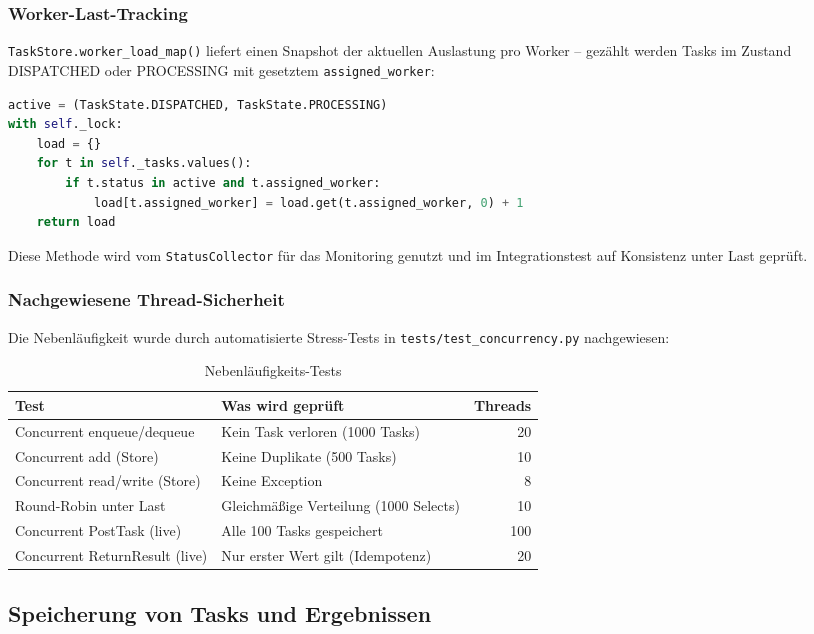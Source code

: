\subsubsection*{Worker-Last-Tracking}

\texttt{TaskStore.worker\_load\_map()} liefert einen Snapshot der aktuellen
Auslastung pro Worker -- gezählt werden Tasks im Zustand DISPATCHED oder PROCESSING
mit gesetztem \texttt{assigned\_worker}:

\begin{lstlisting}[language=Python,caption={worker\_load\_map() -- aktive Tasks pro Worker}]
active = (TaskState.DISPATCHED, TaskState.PROCESSING)
with self._lock:
    load = {}
    for t in self._tasks.values():
        if t.status in active and t.assigned_worker:
            load[t.assigned_worker] = load.get(t.assigned_worker, 0) + 1
    return load
\end{lstlisting}
Diese Methode wird vom \texttt{StatusCollector} für das Monitoring genutzt und
im Integrationstest auf Konsistenz unter Last geprüft.

\subsubsection*{Nachgewiesene Thread-Sicherheit}

Die Nebenläufigkeit wurde durch automatisierte Stress-Tests in
\texttt{tests/test\_concurrency.py} nachgewiesen:

\begin{table}[H]
\centering
\begin{tabular}{llr}
\toprule
\textbf{Test} & \textbf{Was wird geprüft} & \textbf{Threads} \\
\midrule
Concurrent enqueue/dequeue & Kein Task verloren (1000 Tasks) & 20 \\
Concurrent add (Store) & Keine Duplikate (500 Tasks) & 10 \\
Concurrent read/write (Store) & Keine Exception & 8 \\
Round-Robin unter Last & Gleichmäßige Verteilung (1000 Selects) & 10 \\
Concurrent PostTask (live) & Alle 100 Tasks gespeichert & 100 \\
Concurrent ReturnResult (live) & Nur erster Wert gilt (Idempotenz) & 20 \\
\bottomrule
\end{tabular}
\caption{Nebenläufigkeits-Tests}
\end{table}

\subsection{Speicherung von Tasks und Ergebnissen}
\label{sec:adr004}

